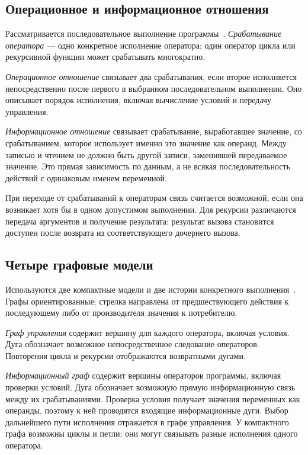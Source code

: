 \documentclass[14pt,a4paper]{extarticle}
\numberwithin{equation}{section}
\numberwithin{figure}{section}
\numberwithin{table}{section}
\begin{document}
\subsection{Операционное и информационное отношения}
Рассматривается последовательное выполнение программы~\cite{voevodin}. \textit{Срабатывание оператора} --- одно конкретное исполнение оператора; один оператор цикла или рекурсивной функции может срабатывать многократно.

\textit{Операционное отношение} связывает два срабатывания, если второе исполняется непосредственно после первого в выбранном последовательном выполнении. Оно описывает порядок исполнения, включая вычисление условий и передачу управления.

\textit{Информационное отношение} связывает срабатывание, выработавшее значение, со срабатыванием, которое использует именно это значение как операнд. Между записью и чтением не должно быть другой записи, заменившей передаваемое значение. Это прямая зависимость по данным, а не всякая последовательность действий с одинаковым именем переменной.

При переходе от срабатываний к операторам связь считается возможной, если она возникает хотя бы в одном допустимом выполнении. Для рекурсии различаются передача аргументов и получение результата: результат вызова становится доступен после возврата из соответствующего дочернего вызова.

\subsection{Четыре графовые модели}
Используются две компактные модели и две истории конкретного выполнения~\cite{voevodin,parallel-course}. Графы ориентированные; стрелка направлена от предшествующего действия к последующему либо от производителя значения к потребителю.

\textit{Граф управления} содержит вершину для каждого оператора, включая условия. Дуга обозначает возможное непосредственное следование операторов. Повторения цикла и рекурсии отображаются возвратными дугами.

\textit{Информационный граф} содержит вершины операторов программы, включая проверки условий. Дуга обозначает возможную прямую информационную связь между их срабатываниями. Проверка условия получает значения переменных как операнды, поэтому к ней проводятся входящие информационные дуги. Выбор дальнейшего пути исполнения отражается в графе управления. У компактного графа возможны циклы и петли: они могут связывать разные исполнения одного оператора.
\end{document}
